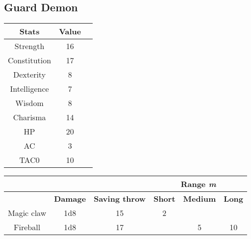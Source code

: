 \subsection{Guard Demon}
\begin{table}[H]
  \centering
\begin{tabular}{|c|c|c|}
\hline
\rowcolor[HTML]{C0C0C0} 
\textbf{Stats} & \textbf{Value } \\ \hline
Strength & 16  \\ \hline
Constitution & 17  \\ \hline
Dexterity & 8  \\ \hline
Intelligence & 7 \\ \hline
Wisdom & 8  \\ \hline
Charisma & 14  \\ \hline
HP & 20  \\ \hline
AC & 3 \\ \hline
TAC0 & 10 \\ \hline
\end{tabular}
\end{table}
\begin{table}[H]
\centering
 \begin{tabular}{lll|c|c|c|}
\cline{4-6}
 &  & & \multicolumn{3}{c|}{\cellcolor[HTML]{C0C0C0}\textbf{Range \textit{m}}} \\ \hline
\rowcolor[HTML]{C0C0C0} 
\multicolumn{1}{|l|}{\cellcolor[HTML]{C0C0C0}\textbf{Weapon}} & \textbf{Damage} & \textbf{Saving throw}&\multicolumn{1}{l|}{\cellcolor[HTML]{C0C0C0}\textbf{Short}} & \textbf{Medium} & \textbf{Long} \\ \hline
\multicolumn{1}{|c|}{Magic claw} & \multicolumn{1}{c|}{1d8} & \multicolumn{1}{c|}{15} & 2 &  &  \\ \hline
\multicolumn{1}{|c|}{Fireball} & \multicolumn{1}{c|}{1d8} & \multicolumn{1}{c|}{17}   &  & 5 & 10 \\ \hline
\end{tabular}
  \end{table}

